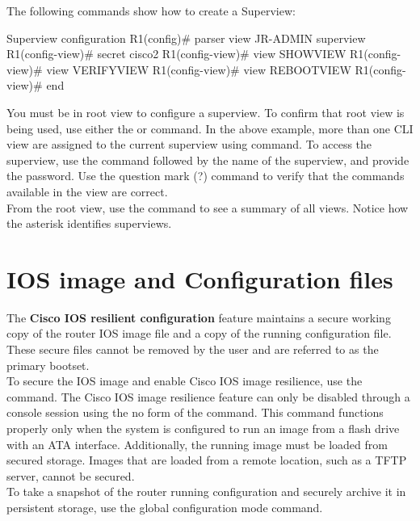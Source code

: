 The following commands show how to create a Superview:

\begin{sexylisting}{Superview configuration}
R1(config)# parser view JR-ADMIN superview
R1(config-view)# secret cisco2
R1(config-view)# view SHOWVIEW
R1(config-view)# view VERIFYVIEW
R1(config-view)# view REBOOTVIEW
R1(config-view)# end
\end{sexylisting}

You must be in root view to configure a superview. To confirm that root view is being used, use either the  or  command. In the above example, more than one CLI view are assigned to the current superview using  command. To access the superview, use the  command followed by the name of the superview, and provide the password. Use the question mark (?) command to verify that the commands available in the view are correct.\\

From the root view, use the  command to see a summary of all views. Notice how the asterisk identifies superviews.

\section{IOS image and Configuration files}

The \textbf{Cisco IOS resilient configuration} feature maintains a secure working copy of the router IOS image file and a copy of the running configuration file. These secure files cannot be removed by the user and are referred to as the primary bootset.\\

To secure the IOS image and enable Cisco IOS image resilience, use the  command.  The Cisco IOS image resilience feature can only be disabled through a console session using the no form of the command. This command functions properly only when the system is configured to run an image from a flash drive with an ATA interface. Additionally, the running image must be loaded from secured storage. Images that are loaded from a remote location, such as a TFTP server, cannot be secured.\\

To take a snapshot of the router running configuration and securely archive it in persistent storage, use the  global configuration mode command.\\

